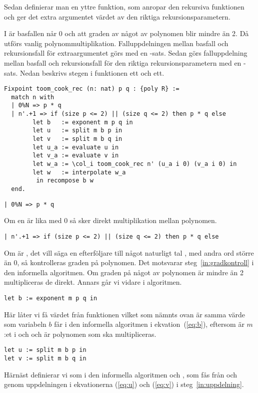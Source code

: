 Sedan definierar man en yttre funktion, som anropar den rekursiva funktionen och
ger det extra argumentet värdet av den riktiga rekursionsparametern.

I  är basfallen  når 0 och att graden av något av polynomen
blir mindre än 2. Då utförs vanlig polynommultiplikation. Falluppdelningen mellan
basfall och rekursionsfall för extraargumentet  görs med en -sats.
Sedan görs falluppdelning mellan basfall och rekursionsfall för den riktiga
rekursionsparametern med en -sats. Nedan beskrivs
stegen i funktionen ett och ett.

\begin{lstlisting}
Fixpoint toom_cook_rec (n: nat) p q : {poly R} :=
  match n with
  | 0%N => p * q
  | n'.+1 => if (size p <= 2) || (size q <= 2) then p * q else
        let b   := exponent m p q in
        let u   := split m b p in
        let v   := split m b q in
        let u_a := evaluate u in
        let v_a := evaluate v in
        let w_a := \col_i toom_cook_rec n' (u_a i 0) (v_a i 0) in
        let w   := interpolate w_a
         in recompose b w
  end.
\end{lstlisting}

\begin{lstlisting}
| 0%N => p * q
\end{lstlisting}
Om en  är lika med 0 så sker direkt multiplikation mellan polynomen.

\begin{lstlisting}
| n'.+1 => if (size p <= 2) || (size q <= 2) then p * q else
\end{lstlisting}
Om  är , det vill säga en efterföljare till något naturligt tal
, med andra ord större än 0, så kontrolleras graden på polynomen. Det
motsvarar steg~\ref{in:gradkontroll} i den informella algoritmen. Om graden på
något av polynomen är mindre än 2 multipliceras de direkt. Annars går vi vidare
i algoritmen.
\begin{lstlisting}
let b := exponent m p q in
\end{lstlisting}
Här låter vi  få värdet från funktionen  vilket som nämnts
ovan är samma värde som variabeln $b$ får i den informella algoritmen i
ekvation~(\ref{eq:b}), eftersom  är $m$:et i \toomm{} och  och  är
polynomen som ska multipliceras.
\begin{lstlisting}
let u := split m b p in
let v := split m b q in
\end{lstlisting}
Härnäst definierar vi som i den informella algoritmen  och , som fås
från  och  genom uppdelningen i ekvationerna (\ref{eq:u}) och
(\ref{eq:v}) i steg~\ref{in:uppdelning}.


